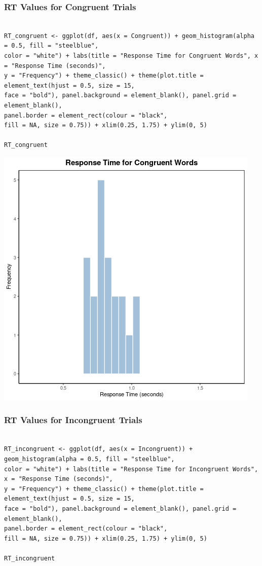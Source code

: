 \documentclass{article}
\begin{document}
\subsubsection{RT Values for Congruent Trials}
\label{sec:org8a70b06}
\begin{verbatim}

RT_congruent <- ggplot(df, aes(x = Congruent)) + geom_histogram(alpha = 0.5, fill = "steelblue", 
color = "white") + labs(title = "Response Time for Congruent Words", x = "Response Time (seconds)", 
y = "Frequency") + theme_classic() + theme(plot.title = element_text(hjust = 0.5, size = 15, 
face = "bold"), panel.background = element_blank(), panel.grid = element_blank(), 
panel.border = element_rect(colour = "black", 
fill = NA, size = 0.75)) + xlim(0.25, 1.75) + ylim(0, 5)

RT_congruent

\end{verbatim}

\begin{center}
\includegraphics[width=.9\linewidth]{converted_stroop5.png}
\end{center}

\subsubsection{RT Values for Incongruent Trials}
\label{sec:org5086791}
\begin{verbatim}

RT_incongruent <- ggplot(df, aes(x = Incongruent)) + geom_histogram(alpha = 0.5, fill = "steelblue", 
color = "white") + labs(title = "Response Time for Incongruent Words", x = "Response Time (seconds)", 
y = "Frequency") + theme_classic() + theme(plot.title = element_text(hjust = 0.5, size = 15, 
face = "bold"), panel.background = element_blank(), panel.grid = element_blank(), 
panel.border = element_rect(colour = "black", 
fill = NA, size = 0.75)) + xlim(0.25, 1.75) + ylim(0, 5)

RT_incongruent

\end{verbatim}
\end{document}
